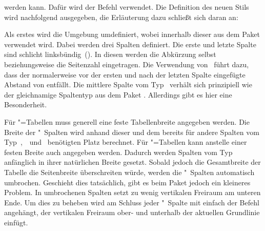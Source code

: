 \documentclass[english,ngerman]{tudscrartcl}
\begin{document}
werden kann. Dafür wird der Befehl  verwendet. Die 
Definition des neuen Stils  wird nachfolgend ausgegeben, 
die Erläuterung dazu schließt sich daran an:
%
\begin{Tutorial}
\end{Tutorial}
%
Als erstes wird die Umgebung  umdefiniert, wobei 
innerhalb dieser  aus dem Paket  verwendet 
wird. Dabei werden drei Spalten definiert. Die erste und letzte Spalte sind 
schlicht linksbündig~(). In diesen werden die Abkürzung selbst 
beziehungsweise die Seitenzahl eingetragen. Die Verwendung von~ 
führt dazu, dass der normalerweise vor der ersten und nach der letzten Spalte 
eingefügte Abstand von  entfällt. Die mittlere Spalte vom 
Typ~ verhält sich prinzipiell wie der gleichnamige Spaltentyp aus dem 
Paket . Allerdings gibt es hier eine Besonderheit.

Für "=Tabellen muss generell eine feste Tabellenbreite 
angegeben werden. Die Breite der "~Spalten wird anhand dieser und 
dem bereits für andere Spalten vom Typ~,~~und~ 
benötigten Platz berechnet. Für "=Tabellen kann anstelle 
einer festen Breite auch  angegeben werden. Dadurch werden 
Spalten vom Typ~ anfänglich in ihrer natürlichen Breite gesetzt. 
Sobald jedoch die Gesamtbreite der Tabelle die Seitenbreite überschreiten 
würde, werden die "~Spalten automatisch umbrochen. Geschieht dies 
tatsächlich, gibt es beim Paket  jedoch ein kleineres Problem. 
In umbrochenen Spalten setzt  zu wenig vertikalen Freiraum am 
unteren Ende. Um dies zu beheben wird am Schluss jeder "~Spalte mit
 einfach der Befehl  angehängt, der 
vertikalen Freiraum ober- und unterhalb der aktuellen Grundlinie einfügt.
\end{document}
